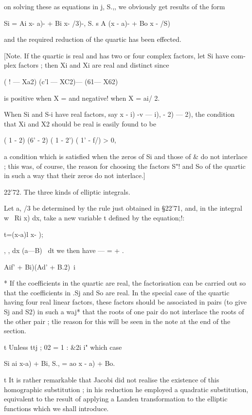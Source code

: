 on solving these as equations in  j, S.,, we obviously get results of the form 

Si = Ai x- a)- + Bi x- /3)-, S.  s A  (x - a)- + Bo  x - /S)  

and the required reduction of the quartic has been effected. 

[Note. If the quartic is real and has two or four complex factors, let Si have com- 
plex factors ; then Xi and Xi are real and distinct since 

( ! — Xa2) (c'l — XC2)— (61— X62)  

is positive when X = and negative! when X = ai/ 2. 

When Si and S-i have real factors, say  x -  i)  -v —  i),    -  2)    —  2), the condition 
that Xi and X2 should be real is easily found to be 

( 1 -  2) (6' -  2) ( 1 -  2') ( 1' - f/) > 0, 

a condition which is satisfied when the zeros of Si and those of \& do not interlace ; this 
was, of course, the reason for choosing the factors  S"! and So of the quartic in such a way 
that their zeros do not interlace.] 

22'72. The three kinds of elliptic integrals. 

Let a, /3 be determined by the rule just obtained in §22'71, and, in the 
integral  w~ Ri  x) dx, take a new variable t defined by the equation;!: 

t=(x-a)l x- ); 

 , , dx (a—B)~ dt 
we then have — = +    . 

    Aif' + Bi)(Ad' + B.2)\ i 

* If the coefficients in the quartic are real, the factorisation can be carried out so that the 
coefficients in .Sj and So are real. In the special case of the quartic having four real linear 
factors, these factors should be associated in pairs (to give Sj and S2) in such a waj* that the 
roots of one pair do not interlace the roots of the other pair ; tlie reason for this will be seen in 
the note at the end of the section. 

t Unless ttj ; 02 =  1 : \&2i i" which case 

Si ai  x-a)  + Bi, S., = ao x - a) + Bo. 

t It is rather remarkable that Jacobi did not realise the existence of this homographic 
substitution ; in his reduction he employed a quadratic substitution, equivalent to the result of 
applying a Landen transformation to the elliptic functions which we shall introduce. 



